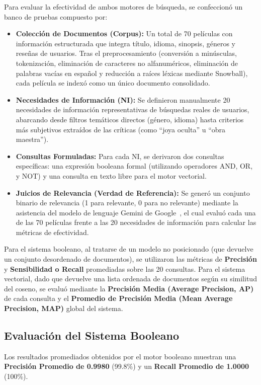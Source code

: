 \documentclass[conference,a4paper]{IEEEtran}
\begin{document}
Para evaluar la efectividad de ambos motores de búsqueda, se confeccionó un banco de pruebas compuesto por:
\begin{itemize}
    \item \textbf{Colección de Documentos (Corpus):} Un total de 70 películas con información estructurada que integra título, idioma, sinopsis, géneros y reseñas de usuarios. Tras el preprocesamiento (conversión a minúsculas, tokenización, eliminación de caracteres no alfanuméricos, eliminación de palabras vacías en español y reducción a raíces léxicas mediante Snowball), cada película se indexó como un único documento consolidado.
    \item \textbf{Necesidades de Información (NI):} Se definieron manualmente 20 necesidades de información representativas de búsquedas reales de usuarios, abarcando desde filtros temáticos directos (género, idioma) hasta criterios más subjetivos extraídos de las críticas (como ``joya oculta'' u ``obra maestra'').
    \item \textbf{Consultas Formuladas:} Para cada NI, se derivaron dos consultas específicas: una expresión booleana formal (utilizando operadores AND, OR, y NOT) y una consulta en texto libre para el motor vectorial.
    \item \textbf{Juicios de Relevancia (Verdad de Referencia):} Se generó un conjunto binario de relevancia (1 para relevante, 0 para no relevante) mediante la asistencia del modelo de lenguaje Gemini de Google~\cite{b6}, el cual evaluó cada una de las 70 películas frente a las 20 necesidades de información para calcular las métricas de efectividad.
\end{itemize}

Para el sistema booleano, al tratarse de un modelo no posicionado (que devuelve un conjunto desordenado de documentos), se utilizaron las métricas de \textbf{Precisión} y \textbf{Sensibilidad o Recall} promediadas sobre las 20 consultas. Para el sistema vectorial, dado que devuelve una lista ordenada de documentos según su similitud del coseno, se evaluó mediante la \textbf{Precisión Media (Average Precision, AP)} de cada consulta y el \textbf{Promedio de Precisión Media (Mean Average Precision, MAP)} global del sistema.

\subsection{Evaluación del Sistema Booleano}

Los resultados promediados obtenidos por el motor booleano muestran una \textbf{Precisión Promedio de 0.9980} (99.8\%) y un \textbf{Recall Promedio de 1.0000} (100\%).
\end{document}
